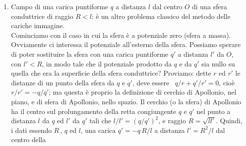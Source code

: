 \begin{enumerate}
\begin{equation}
      \tag{2.36}
    \end{equation}
    dato che $\varphi^{(1)}$, come nella (1.89), \`e il potenziale dovuto solo
    alla distribuzione $\sigma(x,y)$\,: \ $\varphi^{(1)}(0,0,a)=-q/2a$, \ e
    \ $\varphi(x,y,0)=0$.\\
    Possiamo anche calcolare $U$ in modo pi\`u diretto come il lavoro necessario
    per portare la carica $q$ da $z=\infty$ a $z=a$ \ $(x=y=0)$: siccome quando
    la carica \`e a distanza $z$ dal piano su di essa, per la (2.35), si
    esercita la forza $F_z(z)=-q^2/4z^2$, si ha
    \begin{equation}
      U=-\int_\infty^aF_z(z)\,dz
      =\int_\infty^a\frac{q^2}{4z^2}\,dz=-\frac{q^2}{4a}\,\cdot
      \tag{2.36'}
    \end{equation}
    Si noti che $U$ \`e la met\`a dell'energia $-q^2/2a$ del dipolo costituito
    da $q$ e da $-q$ a distanza $2a$: infatti il lavoro per portare due cariche
    (reali) $q$ e $-q$ a distanza $2a$, mantenendole in posizione simmetrica
    rispetto al piano $z=0$, \`e il doppio del lavoro su ciascuna carica; nel
    caso che stiamo considerando una delle due cariche non c'\`e, e quindi il
    lavoro che occorre fare \`e la met\`a (oppure: quando viene spostata la
    carica reale, la carica immagine si sposta da sola!).
  \item Campo di una carica puntiforme $q$ a distanza $l$ dal centro $O$ di una
    sfera conduttrice di raggio $R<l$: \`e un altro problema classico del metodo
    delle cariche immagine.\\
    Cominciamo con il caso in cui la sfera \`e a potenziale zero (sfera a
    massa). Ovviamente ci interessa il potenziale all'esterno della sfera.
    Possiamo sperare di poter sostituire la sfera con una carica puntiforme $q'$
    a distanza $l'$ da $O$, con $l'<R$, in modo tale che il potenziale prodotto
    da $q$ e da $q'$ sia nullo su quella che era la superficie della sfera
    conduttrice? Proviamo: dette $r$ ed $r'$ le distanze di un punto della sfera
    da $q$ e $q'$, deve essere \ $q/r+q'/r'=0$, cio\`e \ $r/r'=-q/q'$; ma questa
    \`e proprio la definizione di cerchio di Apollonio, nel piano, e di sfera di
    Apollonio, nello spazio. Il cerchio (o la sfera) di Apollonio ha il centro
    sul prolungamento della retta congiungente $q$ e $q'$ nel punto a distanza
    $l$ da $q$ ed $l'$ da $q'$ tali
    che $l/l'=(q/q')^2$, e raggio $R=\sqrt{ll'}$. Quindi, i dati essendo $R$\,,
    $q$ ed $l$, una carica $q'=-q\,R/l$ a distanza $l'=R^2/l$ dal centro della

\end{enumerate}
